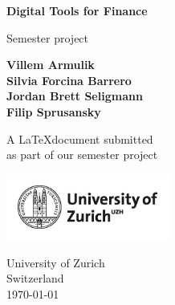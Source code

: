 \documentclass[10pt,a4paper]{article}
\begin{document}
\begin{titlepage}
    \begin{center}
        \vspace*{1cm}
            
        \Huge
        \textbf{Digital Tools for Finance}
            
        \vspace{0.5cm}
        \LARGE
        Semester project
            
        \vspace{1.5cm}
            
        \textbf{Villem Armulik} \\
        \textbf{Silvia Forcina Barrero} \\
        \textbf{Jordan Brett Seligmann} \\
        \textbf{Filip Sprusansky} \\
        
            
        \vfill
            
        A \LaTeX  document submitted \\
        as part of our semester project
            
        \vspace{0.8cm}
            
        \includegraphics[width=0.4\textwidth]{uzh_logo_e_pos_web_main_zone.jpg}
            
        \Large
        University of Zurich\\
        Switzerland\\
        \today
            
    \end{center}
\end{titlepage}

\newpage

\tableofcontents

\newpage

\listoffigures

\listoftables

\newpage
\end{document}
